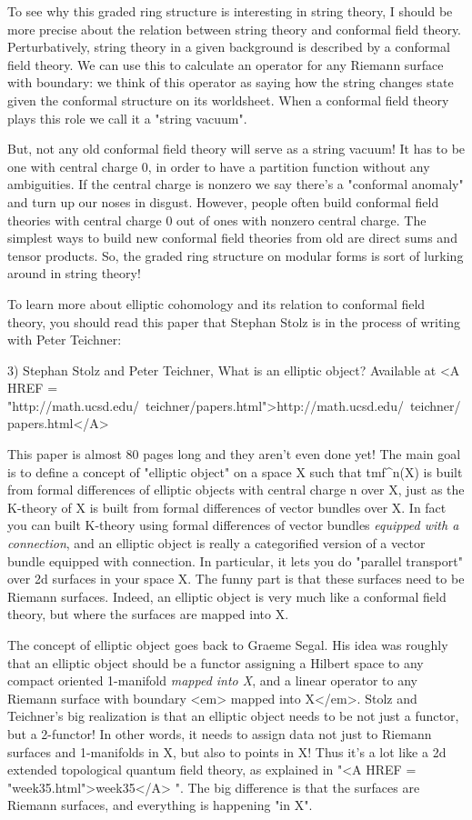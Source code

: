 To see why this graded ring structure is interesting in
string theory, I should be more precise about the relation
between string theory and conformal field theory.  Perturbatively, 
string theory in a given background is described by a conformal 
field theory.  We can use this to calculate an operator for 
any Riemann surface with boundary: we think of this operator as
saying how the string changes state given the conformal structure
on its worldsheet.  When a conformal field theory plays this role 
we call it a "string vacuum".   

But, not any old conformal field theory will serve as a string vacuum!
It has to be one with central charge 0, in order to have a partition 
function without any ambiguities.   If the central charge is nonzero
we say there's a "conformal anomaly" and turn up our noses in 
disgust.  However, people often build conformal field theories with central 
charge 0 out of ones with nonzero central charge.  The simplest ways 
to build new conformal field theories from old are direct sums and 
tensor products.  So, the graded ring structure on modular forms is 
sort of lurking around in string theory!

To learn more about elliptic cohomology and its relation
to conformal field theory, you should read this paper that
Stephan Stolz is in the process of writing with Peter Teichner:

3) Stephan Stolz and Peter Teichner, What is an elliptic object?
Available at
<A HREF = "http://math.ucsd.edu/~teichner/papers.html">http://math.ucsd.edu/~teichner/papers.html</A>

This paper is almost 80 pages long and they aren't even
done yet!  The main goal is to define a concept of "elliptic
object" on a space X such that tmf^{n}(X) is built from
formal differences of elliptic objects with central charge n over X, just as
the K-theory of X is built from formal differences of vector
bundles over X.  In fact you can built K-theory using formal
differences of vector bundles \emph{equipped with a connection},
and an elliptic object is really a categorified version of
a vector bundle equipped with connection.  In particular, 
it lets you do "parallel transport" over 2d surfaces
in your space X.  The funny part is that these surfaces need
to be Riemann surfaces.  Indeed, an elliptic object
is very much like a conformal field theory, but where the surfaces
are mapped into X.  

The concept of elliptic object goes back to Graeme Segal.
His idea was roughly that an elliptic object should be a 
functor assigning a Hilbert space to any 
compact oriented 1-manifold \emph{mapped into X}, and 
a linear operator to any Riemann surface with boundary <em>
mapped into X</em>.
Stolz and Teichner's big realization is that an elliptic
object needs to be not just a functor, but a 2-functor!
In other words, it needs to assign data not just to Riemann
surfaces and 1-manifolds in X, but also to points in X!
Thus it's a lot like a 2d extended topological quantum field
theory, as explained in "<A HREF = "week35.html">week35</A>
".   The 
big difference is that the surfaces are Riemann surfaces,
and everything is happening "in X".

